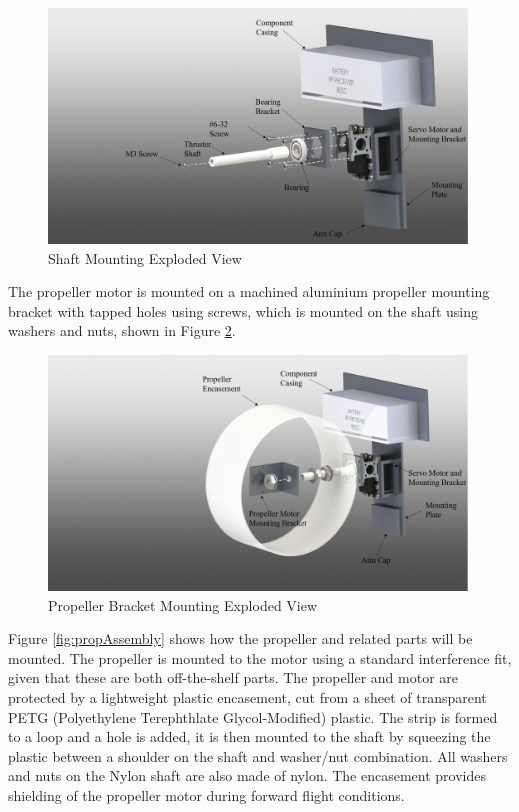 \documentclass[../main.tex]{subfiles}
\begin{document}
  \begin{figure}[H]
 	\centering
 	\includegraphics[width=.8\linewidth]{img/design/thruster/shaftAssembly.png}
 	\caption{Shaft Mounting Exploded View}
 	\label{fig:shaftAssembly}
 \end{figure}
 
The propeller motor is mounted on a machined aluminium propeller mounting bracket with tapped holes using screws, which is mounted on the shaft using washers and nuts, shown in Figure \ref{fig:mountAssembly}.

 \begin{figure}[H]
	\centering
	\includegraphics[width=.8\linewidth]{img/design/thruster/mountAssembly.png}
	\caption{Propeller Bracket Mounting Exploded View}
	\label{fig:mountAssembly}
\end{figure}

 Figure \ref{fig:propAssembly} shows how the propeller and related parts will be mounted. The propeller is mounted to the motor using a standard interference fit, given that these are both off-the-shelf parts. The propeller and motor are protected by a lightweight plastic encasement, cut from a sheet of transparent PETG (Polyethylene Terephthlate Glycol-Modified) plastic. The strip is formed to a loop and a hole is added, it is then mounted to the shaft by squeezing the plastic between a shoulder on the shaft and washer/nut combination. All washers and nuts on the Nylon shaft are also made of nylon. The encasement provides shielding of the propeller motor during forward flight conditions.
\end{document}
